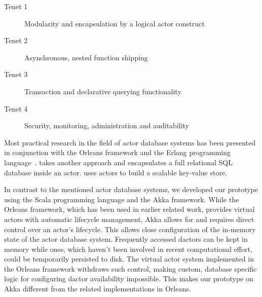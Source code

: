   \begin{description}
    \item[Tenet 1] Modularity and encapsulation by a logical actor construct
    \item[Tenet 2] Asynchronous, nested function shipping
    \item[Tenet 3] Transaction and declarative querying functionality
    \item[Tenet 4] Security, monitoring, administration and auditability
  \end{description}

  Most practical research in the field of actor database systems has been presented in conjunction with the Orleans framework and the Erlang programming language~\cite{Shah:reactdb,Eldeeb:transactions,Bernstein:indexing}.
   takes another approach and encapsulates a full relational SQL database inside an actor.
   uses actors to build a scalable key-value store.

  In contrast to the mentioned actor database systems, we developed our prototype using the Scala programming language and the Akka framework.
  While the Orleans framework, which has been used in earlier related work, provides virtual actors with automatic lifecycle management, Akka allows for and requires direct control over an actor's lifecycle.
  This allows close configuration of the in-memory state of the actor database system.
  Frequently accessed \glspl{dactor} can be kept in memory while ones, which haven't been involved in recent computational effort, could be temporarily persisted to disk.
  The virtual actor system implemented in the Orleans framework withdraws such control, making custom, database specific logic for configuring \gls{dactor} availability impossible.
  This makes our prototype on Akka different from the related implementations in Orleans.

